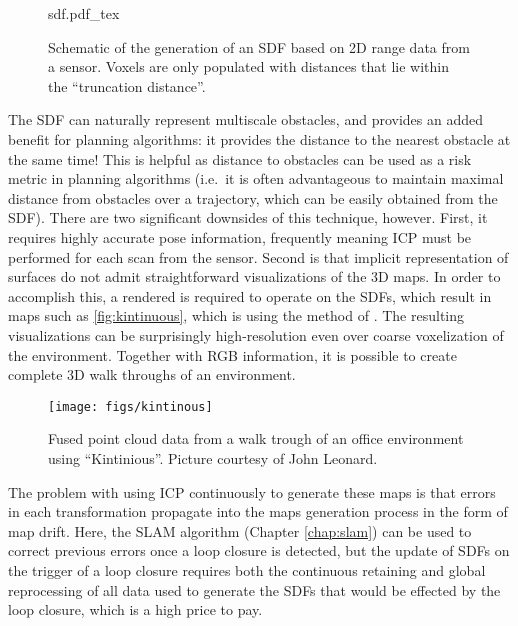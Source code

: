 \begin{figure}
    \centering
    \def\svgwidth{0.8\textwidth}
    {sdf.pdf_tex}
    \caption{Schematic of the generation of an SDF based on 2D range data from a sensor. Voxels are only populated with distances that lie within the ``truncation distance''.\label{fig:sdf}}
\end{figure}


The SDF can naturally represent multiscale obstacles, and provides an added
benefit for planning algorithms: it provides the distance to the nearest
obstacle at the same time! This is helpful as distance to obstacles can be used
as a risk metric in planning algorithms (i.e.\ it is often advantageous to
maintain maximal distance from obstacles over a trajectory, which can be easily
obtained from the SDF). There are two significant downsides of this technique,
however.  First, it requires highly accurate pose information, frequently
meaning ICP must be performed for each scan from the sensor. Second is that
implicit representation of surfaces do not admit straightforward visualizations
of the 3D maps. In order to accomplish this, a rendered is required to operate
on the SDFs, which result in maps such as \cref{fig:kintinuous}, which is using
the method of \cite{whelan2013robust}.  The resulting visualizations can be
surprisingly high-resolution even over coarse voxelization of the environment.
Together with RGB information, it is possible to create complete 3D walk
throughs of an environment.

\begin{figure}
    \centering
    \texttt{[image: figs/kintinous]}
    \caption{Fused point cloud data from a walk trough of an office environment using ``Kintinious''. Picture courtesy of John Leonard.\label{fig:kintinous}}
\end{figure}


The problem with using ICP continuously to generate these maps is that errors
in each transformation propagate into the maps generation process in the form
of map drift. Here, the SLAM algorithm (Chapter
\ref{chap:slam}) can be used to correct previous errors
once a loop closure is detected, but the update of SDFs on the trigger of a loop
closure requires both the continuous retaining and global reprocessing of all
data used to generate the SDFs that would be effected by the loop closure, which
is a high price to pay.


